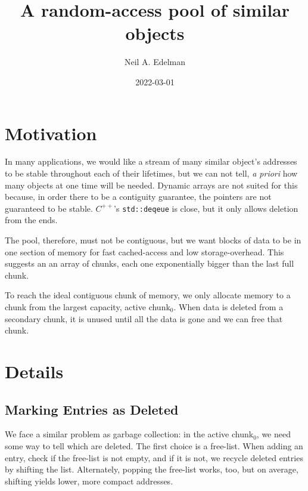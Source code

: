\documentclass[12pt]{article}
\author{Neil A. Edelman}
\title{A random-access pool of similar objects}
\date{2022-03-01}
\newcommand{\code}[1]{\colorbox{light-gray}{\texttt{#1}}}
\begin{document}
\maketitle


\section{Motivation}

In many applications, we would like a stream of many similar object's addresses to be stable throughout each of their lifetimes, but we can not tell, {\it a priori} how many objects at one time will be needed. Dynamic arrays are not suited for this because, in order there to be a contiguity guarantee, the pointers are not guaranteed to be stable. $C^{++}$'s \code{std::deqeue} is close, but it only allows deletion from the ends.

The pool, therefore, must not be contiguous, but we want blocks of data to be in one section of memory for fast cached-access and low storage-overhead. This suggests an an array of chunks, each one exponentially bigger than the last full chunk.

To reach the ideal contiguous chunk of memory, we only allocate memory to a chunk from the largest capacity, active chunk$_0$. When data is deleted from a secondary chunk, it is unused until all the data is gone and we can free that chunk.

\section{Details}

\subsection{Marking Entries as Deleted}

We face a similar problem as garbage collection: in the active chunk$_0$, we need some way to tell which are deleted. The first choice is a free-list. When adding an entry, check if the free-list is not empty, and if it is not, we recycle deleted entries by shifting the list. Alternately, popping the free-list works, too, but on average, shifting yields lower, more compact addresses.
\end{document}
